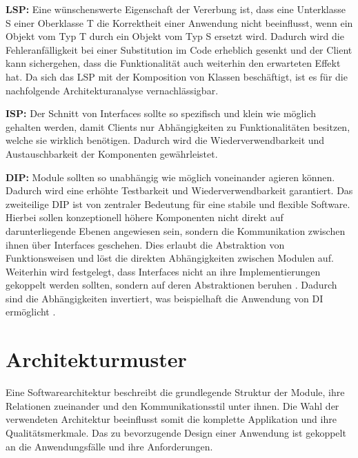 \textbf{\acrlong{LSP}: } {Eine wünschenswerte Eigenschaft der Vererbung ist, dass eine Unterklasse S einer Oberklasse T die Korrektheit einer Anwendung nicht beeinflusst, wenn ein Objekt vom Typ T durch ein Objekt vom Typ S ersetzt wird. Dadurch wird die Fehleranfälligkeit bei einer Substitution im Code erheblich gesenkt und der Client kann sichergehen, dass die Funktionalität auch weiterhin den erwarteten Effekt hat. Da sich das LSP mit der Komposition von Klassen beschäftigt, ist es für die nachfolgende Architekturanalyse vernachlässigbar. \cite{Martin.2018, Liskov.1994}}

\textbf{\acrlong{ISP}: } {Der Schnitt von Interfaces sollte so spezifisch und klein wie möglich gehalten werden, damit Clients nur Abhängigkeiten zu Funktionalitäten besitzen, welche sie wirklich benötigen. Dadurch wird die Wiederverwendbarkeit und Austauschbarkeit der Komponenten gewährleistet. \cite{Martin.2018}\cite[S. 135ff.]{Martin.2003}}

\textbf{\acrlong{DIP}: } {Module sollten so unabhängig wie möglich voneinander agieren können. Dadurch wird eine erhöhte Testbarkeit und Wiederverwendbarkeit garantiert. Das zweiteilige DIP ist von zentraler Bedeutung für eine stabile und flexible Software. Hierbei sollen konzeptionell höhere Komponenten nicht direkt auf darunterliegende Ebenen angewiesen sein, sondern die Kommunikation zwischen ihnen über Interfaces geschehen. Dies erlaubt die Abstraktion von Funktionsweisen und löst die direkten Abhängigkeiten zwischen Modulen auf. Weiterhin wird festgelegt, dass Interfaces nicht an ihre Implementierungen gekoppelt werden sollten, sondern auf deren Abstraktionen beruhen \cite{Martin.1996, Martin.2018}. Dadurch sind die Abhängigkeiten invertiert, was beispielhaft die Anwendung von \Gls{DI} ermöglicht \cite{Fowler.2004}.}


\section{Architekturmuster}

Eine Softwarearchitektur beschreibt die grundlegende Struktur der Module, ihre Relationen zueinander und den Kommunikationsstil unter ihnen. Die Wahl der verwendeten Architektur beeinflusst somit die komplette Applikation und ihre Qualitätsmerkmale. Das zu bevorzugende Design einer Anwendung ist gekoppelt an die Anwendungsfälle und ihre Anforderungen. 

